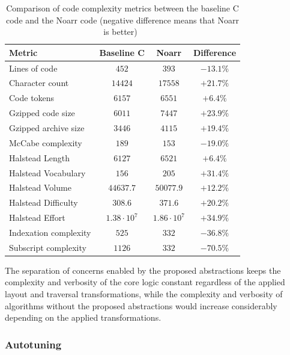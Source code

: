 \begin{table}[htbp]
  \caption{Comparison of code complexity metrics between the baseline C code and the Noarr code (negative difference means that Noarr is better)~\cite{klepl2024abstractions}}%
  \label{tab:code-complexity}
  \scriptsize\centering%
  \begin{tabular}{|l|c|c|c|}
    \hline
    \textbf{Metric} & \textbf{Baseline C} & \textbf{Noarr} & \textbf{Difference} \\
    \hline
    Lines of code & $452$ & $393$ & $-13.1\%$ \\
    \hline
    Character count & $14424$ & $17558$ & $+21.7\%$ \\
    \hline
    Code tokens & $6157$ & $6551$ & $+6.4\%$ \\
    \hline
    Gzipped code size & $6011$ & $7447$ & $+23.9\%$ \\
    \hline
    Gzipped archive size & $3446$ & $4115$ & $+19.4\%$ \\
    \hline
    \hline
    McCabe complexity & $189$ & $153$ & $-19.0\%$ \\
    \hline
    Halstead Length & $6127$ & $6521$ & $+6.4\%$ \\
    \hline
    Halstead Vocabulary & $156$ & $205$ & $+31.4\%$ \\
    \hline
    Halstead Volume & $44637.7$ & $50077.9$ & $+12.2\%$ \\
    \hline
    Halstead Difficulty & $308.6$ & $371.6$ & $+20.2\%$ \\
    \hline
    Halstead Effort & $1.38 \cdot 10^7$ & $1.86 \cdot 10^7$ & $+34.9\%$ \\
    \hline
    \hline
    Indexation complexity & $525$ & $332$ & $-36.8\%$ \\
    \hline
    Subscript complexity & $1126$ & $332$ & $-70.5\%$ \\
    \hline
  \end{tabular}
\end{table}

The separation of concerns enabled by the proposed abstractions keeps the complexity and verbosity of the core logic constant regardless of the applied layout and traversal transformations, while the complexity and verbosity of algorithms without the proposed abstractions would increase considerably depending on the applied transformations.


\subsubsection{Autotuning}\label{sec:abstractions-autotuning}

